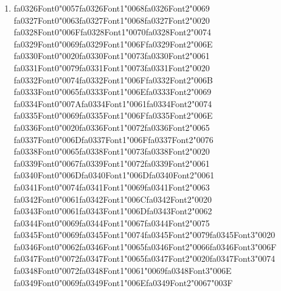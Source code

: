 \documentclass[12pt]{article}
\begin{document}
\begin{enumerate}[label=Q\arabic*.]
 \item {\csname fa0326Font0\endcsname\char"0057}{\csname fa0326Font1\endcsname\char"0068}{\csname fa0326Font2\endcsname\char"0069} {\csname fa0327Font0\endcsname\char"0063}{\csname fa0327Font1\endcsname\char"0068}{\csname fa0327Font2\endcsname\char"0020} {\csname fa0328Font0\endcsname\char"006F}{\csname fa0328Font1\endcsname\char"0070}{\csname fa0328Font2\endcsname\char"0074} {\csname fa0329Font0\endcsname\char"0069}{\csname fa0329Font1\endcsname\char"006F}{\csname fa0329Font2\endcsname\char"006E} {\csname fa0330Font0\endcsname\char"0020}{\csname fa0330Font1\endcsname\char"0073}{\csname fa0330Font2\endcsname\char"0061} {\csname fa0331Font0\endcsname\char"0079}{\csname fa0331Font1\endcsname\char"0073}{\csname fa0331Font2\endcsname\char"0020} {\csname fa0332Font0\endcsname\char"0074}{\csname fa0332Font1\endcsname\char"006F}{\csname fa0332Font2\endcsname\char"006B} {\csname fa0333Font0\endcsname\char"0065}{\csname fa0333Font1\endcsname\char"006E}{\csname fa0333Font2\endcsname\char"0069} {\csname fa0334Font0\endcsname\char"007A}{\csname fa0334Font1\endcsname\char"0061}{\csname fa0334Font2\endcsname\char"0074} {\csname fa0335Font0\endcsname\char"0069}{\csname fa0335Font1\endcsname\char"006F}{\csname fa0335Font2\endcsname\char"006E} {\csname fa0336Font0\endcsname\char"0020}{\csname fa0336Font1\endcsname\char"0072}{\csname fa0336Font2\endcsname\char"0065} {\csname fa0337Font0\endcsname\char"006D}{\csname fa0337Font1\endcsname\char"006F}{\csname fa0337Font2\endcsname\char"0076} {\csname fa0338Font0\endcsname\char"0065}{\csname fa0338Font1\endcsname\char"0073}{\csname fa0338Font2\endcsname\char"0020} {\csname fa0339Font0\endcsname\char"0067}{\csname fa0339Font1\endcsname\char"0072}{\csname fa0339Font2\endcsname\char"0061} {\csname fa0340Font0\endcsname\char"006D}{\csname fa0340Font1\endcsname\char"006D}{\csname fa0340Font2\endcsname\char"0061} {\csname fa0341Font0\endcsname\char"0074}{\csname fa0341Font1\endcsname\char"0069}{\csname fa0341Font2\endcsname\char"0063} {\csname fa0342Font0\endcsname\char"0061}{\csname fa0342Font1\endcsname\char"006C}{\csname fa0342Font2\endcsname\char"0020} {\csname fa0343Font0\endcsname\char"0061}{\csname fa0343Font1\endcsname\char"006D}{\csname fa0343Font2\endcsname\char"0062} {\csname fa0344Font0\endcsname\char"0069}{\csname fa0344Font1\endcsname\char"0067}{\csname fa0344Font2\endcsname\char"0075} {\csname fa0345Font0\endcsname\char"0069}{\csname fa0345Font1\endcsname\char"0074}{\csname fa0345Font2\endcsname\char"0079}{\csname fa0345Font3\endcsname\char"0020} {\csname fa0346Font0\endcsname\char"0062}{\csname fa0346Font1\endcsname\char"0065}{\csname fa0346Font2\endcsname\char"0066}{\csname fa0346Font3\endcsname\char"006F} {\csname fa0347Font0\endcsname\char"0072}{\csname fa0347Font1\endcsname\char"0065}{\csname fa0347Font2\endcsname\char"0020}{\csname fa0347Font3\endcsname\char"0074} {\csname fa0348Font0\endcsname\char"0072}{\csname fa0348Font1\endcsname\char"0061}{\char"0069}{\csname fa0348Font3\endcsname\char"006E} {\csname fa0349Font0\endcsname\char"0069}{\csname fa0349Font1\endcsname\char"006E}{\csname fa0349Font2\endcsname\char"0067}{\char"003F}

\end{enumerate}
\end{document}
